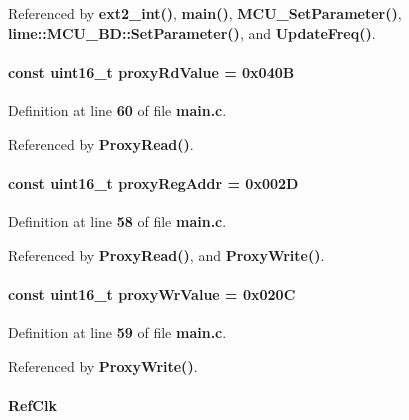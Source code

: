 Referenced by {\bf ext2\+\_\+int()}, {\bf main()}, {\bf M\+C\+U\+\_\+\+Set\+Parameter()}, {\bf lime\+::\+M\+C\+U\+\_\+\+B\+D\+::\+Set\+Parameter()}, and {\bf Update\+Freq()}.

\paragraph[{proxy\+Rd\+Value}]{\setlength{\rightskip}{0pt plus 5cm}const uint16\+\_\+t proxy\+Rd\+Value = 0x040B}\label{main_8c_a5d1eac4399ffde68aeaccc3748549836}


Definition at line {\bf 60} of file {\bf main.\+c}.



Referenced by {\bf Proxy\+Read()}.

\paragraph[{proxy\+Reg\+Addr}]{\setlength{\rightskip}{0pt plus 5cm}const uint16\+\_\+t proxy\+Reg\+Addr = 0x002D}\label{main_8c_aff35d95ffe1110d0fefdb88cef23f2ce}


Definition at line {\bf 58} of file {\bf main.\+c}.



Referenced by {\bf Proxy\+Read()}, and {\bf Proxy\+Write()}.

\paragraph[{proxy\+Wr\+Value}]{\setlength{\rightskip}{0pt plus 5cm}const uint16\+\_\+t proxy\+Wr\+Value = 0x020C}\label{main_8c_afbf39a92d158d558616df89e9dbb531b}


Definition at line {\bf 59} of file {\bf main.\+c}.



Referenced by {\bf Proxy\+Write()}.

\paragraph[{Ref\+Clk}]{ Ref\+Clk}\label{main_8c_ade9c63dab5fa56fdab2394edec268508}


